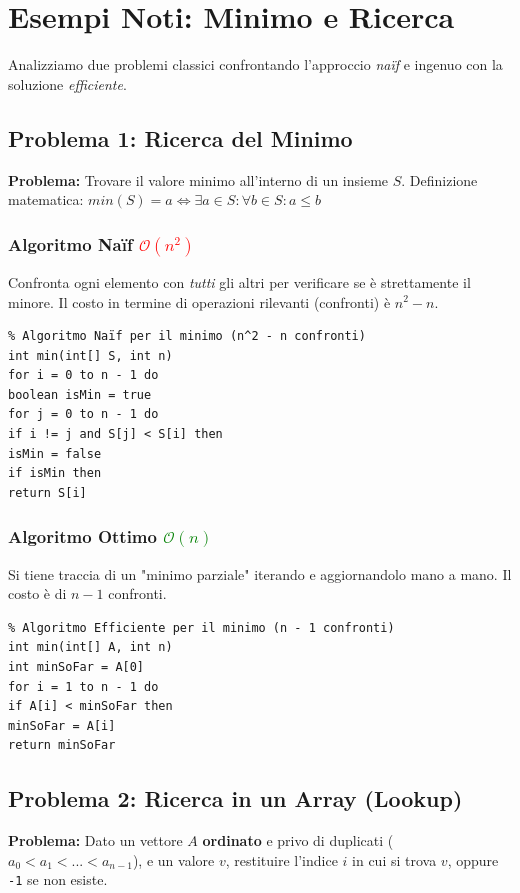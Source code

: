 \documentclass[12pt, a4paper]{article}
\begin{document}
\newpage

\section{Esempi Noti: Minimo e Ricerca}

Analizziamo due problemi classici confrontando l'approccio \textit{naïf} e ingenuo con la soluzione \textit{efficiente}.

\subsection{Problema 1: Ricerca del Minimo}
\textbf{Problema:} Trovare il valore minimo all'interno di un insieme $S$.
Definizione matematica: $min(S) = a \Leftrightarrow \exists a \in S : \forall b \in S : a \le b$

\subsubsection{Algoritmo Naïf \texorpdfstring{\textcolor{red}{$\mathcal{O}(n^2)$}}{O(n²)}}
Confronta ogni elemento con \textit{tutti} gli altri per verificare se è strettamente il minore. Il costo in termine di operazioni rilevanti (confronti) è $n^2 - n$.


\begin{verbatim}
% Algoritmo Naïf per il minimo (n^2 - n confronti)
int min(int[] S, int n)
for i = 0 to n - 1 do
boolean isMin = true
for j = 0 to n - 1 do
if i != j and S[j] < S[i] then
isMin = false
if isMin then
return S[i]
\end{verbatim}

\subsubsection{Algoritmo Ottimo \texorpdfstring{\textcolor{green}{$\mathcal{O}(n)$}}{O(n)}}
Si tiene traccia di un "minimo parziale" iterando e aggiornandolo mano a mano. Il costo è di $n - 1$ confronti.

\begin{verbatim}
% Algoritmo Efficiente per il minimo (n - 1 confronti)
int min(int[] A, int n)
int minSoFar = A[0]
for i = 1 to n - 1 do
if A[i] < minSoFar then
minSoFar = A[i]
return minSoFar
\end{verbatim}

\subsection{Problema 2: Ricerca in un Array (Lookup)}
\textbf{Problema:} Dato un vettore $A$ \textbf{ordinato} e privo di duplicati ($a_0 < a_1 < ... < a_{n-1}$), e un valore $v$, restituire l'indice $i$ in cui si trova $v$, oppure \verb|-1| se non esiste.
\end{document}
